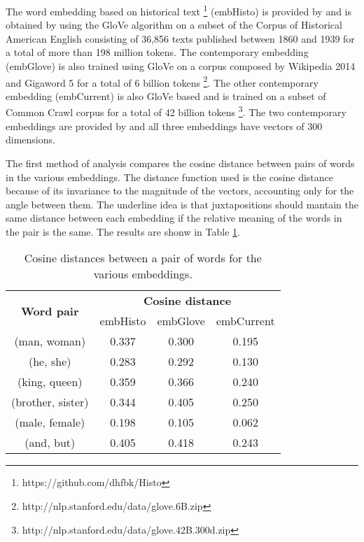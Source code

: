 \documentclass[runningheads]{llncs}
\begin{document}
The word embedding based on historical text \footnote{https://github.com/dhfbk/Histo} (embHisto) is provided by \cite{histo} and is obtained by using the GloVe algorithm on a subset of the Corpus of Historical American English consisting of 36,856 texts published between 1860 and 1939 for a total of more than 198 million tokens. The contemporary embedding (embGlove) is also trained using GloVe on a corpus composed by Wikipedia 2014 and Gigaword 5 for a total of 6 billion tokens \footnote{http://nlp.stanford.edu/data/glove.6B.zip}. The other contemporary embedding (embCurrent) is also GloVe based and is trained on a subset of Common Crawl corpus for a total of 42 billion tokens \footnote{http://nlp.stanford.edu/data/glove.42B.300d.zip}. The two contemporary embeddings are provided by \cite{glove} and all three embeddings have vectors of 300 dimensions.

The first method of analysis compares the cosine distance between pairs of words in the various embeddings. The distance function used is the cosine distance because of its invariance to the magnitude of the vectors, accounting only for the angle between them. The underline idea is that juxtapositions should mantain the same distance between each embedding if the relative meaning of the words in the pair is the same. The results are shonw in Table \ref{tab:juxtapos}.

\begin{table}
\centering
\caption{Cosine distances between a pair of words for the various embeddings.}
\label{tab:juxtapos}
\begin{tabular}{|c|c|c|c|}
\hline
\multirow{2}{*}{{\bfseries Word pair}} & \multicolumn{3}{|c|}{{\bfseries Cosine distance}}\\\cline{2-4}
&embHisto&embGlove&embCurrent\\
\hline
(man, woman) &  0.337 & 0.300 & 0.195\\
(he, she) & 0.283 & 0.292 & 0.130\\
(king, queen) & 0.359 & 0.366 & 0.240\\
(brother, sister) & 0.344 & 0.405 & 0.250\\
(male, female) & 0.198 & 0.105 & 0.062\\
(and, but) & 0.405 & 0.418 & 0.243\\
\hline
\end{tabular}
\end{table}
\end{document}

